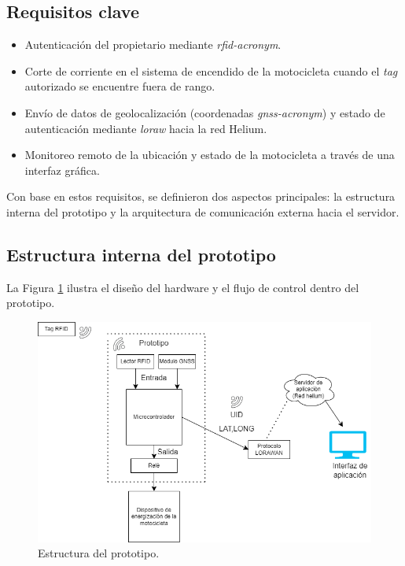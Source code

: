 \subsection{Requisitos clave}

\begin{itemize}
    \item Autenticación del propietario mediante \textit{\acrshort{rfid-acronym}}.
    \item Corte de corriente en el sistema de encendido de la motocicleta cuando el \textit{tag} autorizado se encuentre fuera de rango.
    \item Envío de datos de geolocalización (coordenadas \textit{\acrshort{gnss-acronym}}) y estado de autenticación mediante \textit{\acrshort{loraw}} hacia la red Helium.
    \item Monitoreo remoto de la ubicación y estado de la motocicleta a través de una interfaz gráfica.
\end{itemize}

Con base en estos requisitos, se definieron dos aspectos principales: la estructura interna del prototipo y la arquitectura de comunicación externa hacia el servidor. 

\subsection{Estructura interna del prototipo}

La Figura \ref{fig:diagrama1} ilustra el diseño del hardware y el flujo de control dentro del prototipo.

\begin{figure}[H]
\leavevmode
\begin{minipage}{\textwidth}
\begin{center}
\includegraphics[scale=0.5]{./capitulo_04/imagen/diagrama1.png}
\caption{Estructura del prototipo. \label{fig:diagrama1}}
\end{center}
\end{minipage}
\end{figure}

